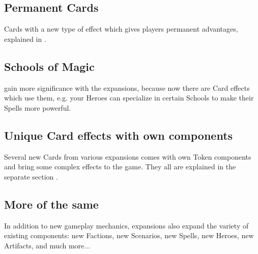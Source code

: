 \begin{multicols*}{2}
\subsection*{Permanent Cards}
Cards with a new type of effect which gives players permanent advantages, explained in .

\subsection*{Schools of Magic}
 gain more significance with the expansions, because now there are Card effects which use them, e.g. your Heroes can specialize in certain Schools to make their Spells more powerful.

\subsection*{Unique Card effects with own components}
Several new Cards from various expansions comes with own Token components and bring some complex effects to the game.
They all are explained in the separate section .

\subsection*{More of the same}
In addition to new gameplay mechanics, expansions also expand the variety of existing components: new Factions, new Scenarios, new Spells, new Heroes, new Artifacts, and much more...

\vspace*{\fill}
\end{multicols*}
\pagebreak

